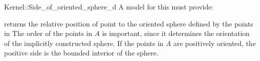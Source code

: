 \begin{ccRefFunctionObjectConcept}{Kernel::Side_of_oriented_sphere_d}
A model for this must provide:


 {returns the relative position of point
   to the oriented sphere defined by the points in \ccc{A =
    tuple [first,last)} The order of the points in $A$ is important,
  since it determines the orientation of the implicitly constructed
  sphere.  If the points in $A$ are positively oriented, the positive
  side is the bounded interior of the sphere.    }

\end{ccRefFunctionObjectConcept}
